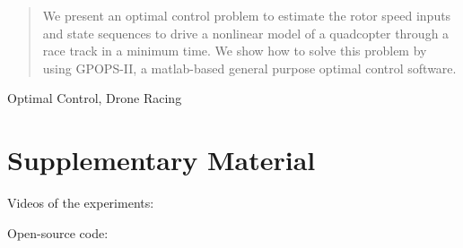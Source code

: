 \begin{abstract}
    We present an optimal control problem to estimate the rotor speed inputs and state sequences to drive a nonlinear model of a quadcopter through a race track in a minimum time.
    We show how to solve this problem by using \textrm{GPOPS-II}, a matlab-based general purpose optimal control software.
\end{abstract}

\begin{IEEEkeywords}
    Optimal Control, Drone Racing
\end{IEEEkeywords}

\section*{Supplementary Material}
Videos of the experiments: 

Open-source code: 


